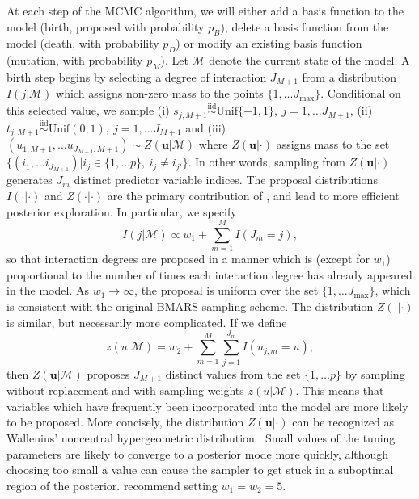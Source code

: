 \documentclass{article} %
\begin{document}
At each step of the MCMC algorithm, we will either add a basis function to the model (birth, proposed with probability $p_B$), delete a basis function from the model (death, with probability $p_D$) or modify an existing basis function (mutation, with probability $p_M$). Let $\mathcal M$ denote the current state of the model. A birth step begins by selecting a degree of interaction $J_{M+1}$ from a distribution $I(j|\mathcal M)$ which assigns non-zero mass to the points $\{1,\ldots J_\text{max}\}$. Conditional on this selected value, we sample (i) $s_{j,M+1} \stackrel{\text{iid}}{\sim}\text{Unif}\{-1, 1\}, \ j=1,\ldots J_{M+1}$,
(ii) $t_{j,M+1} \stackrel{\text{iid}}{\sim}\text{Unif}(0, 1), \ j=1,\ldots J_{M+1}$ and (iii) $(u_{1,M+1},\ldots u_{J_{M+1},M+1}) \sim Z(\bm u|\mathcal M)$ where $Z(\bm u|\cdot)$ assigns mass to the set $\{(i_1, \ldots i_{J_{M+1}}) | i_j\in\{1,\ldots p\}, \ i_j\neq i_{j'}\}.$ In other words, sampling from $Z(\bm u|\cdot)$ generates $J_m$ distinct predictor variable indices. The proposal distributions $I(\cdot|\cdot)$ and $Z(\cdot|\cdot)$ are the primary contribution of \cite{nott2005}, and lead to more efficient posterior exploration. In particular, we specify
$$I(j|\mathcal M) \propto w_1 + \sum_{m=1}^MI(J_m= j),$$
so that interaction degrees are proposed in a manner which is (except for $w_1$) proportional to the number of times each interaction degree has already appeared in the model. As $w_1\rightarrow\infty$, the proposal is uniform over the set $\{1,\ldots J_\text{max}\}$, which is consistent with the original BMARS sampling scheme. The distribution $Z(\cdot|\cdot)$ is similar, but necessarily more complicated. If we define
$$z(u|\mathcal M) = w_2 + \sum_{m=1}^M\sum_{j=1}^{J_m}I(u_{j,m}=u),$$
then $Z(\bm u|\mathcal M)$ proposes $J_{M+1}$ distinct values from the set $\{1,\ldots p\}$ by sampling without replacement and with sampling weights $z(u|\mathcal M)$. This means that variables which have frequently been incorporated into the model are more likely to be proposed. More concisely, the distribution $Z(\bm u|\cdot)$ can be recognized as Wallenius' noncentral hypergeometric distribution \citep{fog2008calculation}. Small values of the tuning parameters are likely to converge to a posterior mode more quickly, although choosing too small a value can cause the sampler to get stuck in a suboptimal region of the posterior. \cite{francom2020} recommend setting $w_1 = w_2 = 5$.
\end{document}
